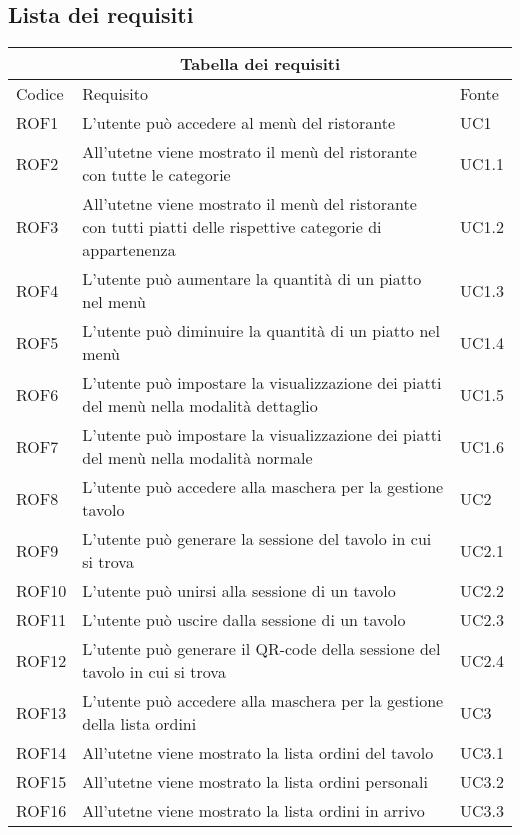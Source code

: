 \subsection{Lista dei requisiti}
\begin{center}
    \renewcommand{\arraystretch}{1.5}
    \begin{longtable}{ |p{1.5cm}|p{9cm}|p{1.5cm}|  }
        \hline
        \multicolumn{3}{|c|}{Tabella dei requisiti} \\
        \hline
        Codice&Requisito &Fonte \\
        \hline
        \endhead
        ROF1&L'utente può accedere al menù del ristorante&UC1 \\
        ROF2&All'utetne viene mostrato il menù del ristorante con tutte le categorie&UC1.1 \\
        ROF3&All'utetne viene mostrato il menù del ristorante con tutti piatti delle rispettive categorie di appartenenza&UC1.2 \\
        ROF4&L'utente può aumentare la quantità di un piatto nel menù&UC1.3 \\
        ROF5&L'utente può diminuire la quantità di un piatto nel menù&UC1.4 \\
        ROF6&L'utente può impostare la visualizzazione dei piatti del menù nella modalità dettaglio&UC1.5 \\
        ROF7&L'utente può impostare la visualizzazione dei piatti del menù nella modalità normale&UC1.6 \\
        ROF8&L'utente può accedere alla maschera per la gestione tavolo &UC2 \\
        ROF9&L'utente può generare la sessione del tavolo in cui si trova&UC2.1\\
        ROF10&L'utente può unirsi alla sessione di un tavolo&UC2.2 \\
        ROF11&L'utente può uscire dalla sessione di un tavolo&UC2.3\\
        ROF12&L'utente può generare il QR-code della sessione del tavolo in cui si trova&UC2.4\\
        ROF13&L'utente può accedere alla maschera per la gestione della lista ordini&UC3 \\
        ROF14&All'utetne viene mostrato la lista ordini del tavolo&UC3.1 \\
        ROF15&All'utetne viene mostrato la lista ordini personali &UC3.2 \\
        ROF16&All'utetne viene mostrato la lista ordini in arrivo&UC3.3 \\

\end{longtable}
\end{center}
